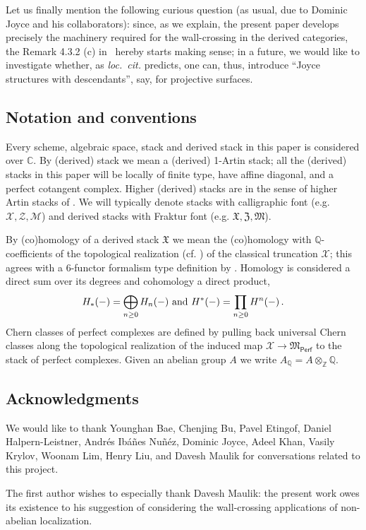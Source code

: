 \documentclass[12pt]{amsart}
\theoremstyle{definition}
\newcommand{\BC}{{\mathbb{C}}}
\newcommand{\BQ}{{\mathbb{Q}}}
\newcommand{\BZ}{{\mathbb{Z}}}
\newcommand{\CM}{{\mathcal M}}
\newcommand{\CX}{{\mathcal X}}
\newcommand{\CZ}{{\mathcal Z}}
\newcommand{\1}{\mathbf 1}
\newcommand{\FM}{{\mathfrak{M}}}
\newcommand{\FX}{{\mathfrak{X}}}
\newcommand{\FZ}{{\mathfrak{Z}}}
\newcommand{\Perf}{\mathsf{Perf}}
\begin{document}
Let us finally mention the following curious question (as usual,  due to Dominic Joyce and his collaborators): since, as we explain, the present paper develops precisely the machinery required for the wall-crossing in the derived categories, the Remark 4.3.2 (c) in~\cite{GJT} hereby starts making sense; in a future, we would like to investigate whether, as \textit{loc.~cit.} predicts, one can, thus, introduce ``Joyce structures with descendants'', say, for projective surfaces.

\subsection{Notation and conventions}\label{subsec: notation}
Every scheme, algebraic space, stack and derived stack in this paper is considered over $\BC$. By (derived) stack we mean a (derived) 1-Artin stack; all the (derived) stacks in this paper will be locally of finite type, have affine diagonal, and a perfect cotangent complex. Higher (derived) stacks are in the sense of higher Artin stacks of \cite{higherstackstoen}. We will typically denote stacks with calligraphic font (e.g. $\CX, \CZ, \CM$) and derived stacks with Fraktur font (e.g. $\FX, \FZ, \FM$).

By (co)homology of a derived stack $\FX$ we mean the (co)homology with $\BQ$-coefficients of the topological realization (cf. \cite[Section 3]{B16}) of the classical truncation $\CX$; this agrees with a 6-functor formalism type definition by \cite[Proposition 2.8]{khanequivcoh}. Homology is considered a direct sum over its degrees and cohomology a direct product, 
\[H_\ast(-)=\bigoplus_{n\geq 0}H_n(-)\textup{ and }H^\ast(-)=\prod_{n\geq 0}H^n(-)\,.\]
Chern classes of perfect complexes are defined by pulling back universal Chern classes along the topological realization of the induced map $\CX\to \FM_{\Perf}$ to the stack of perfect complexes. Given an abelian group $A$ we write $A_\BQ=A\otimes_\BZ \BQ$.


\subsection{Acknowledgments} We would like to thank Younghan Bae, Chenjing Bu, Pavel Etingof, Daniel Halpern-Leistner, Andrés Ibáñes Nuñéz, Dominic Joyce, Adeel Khan, Vasily Krylov,  Woonam Lim, Henry Liu, and Davesh Maulik for conversations related to this project.

The first author wishes to especially thank Davesh Maulik: the present work owes its existence to his suggestion of considering the wall-crossing applications of non-abelian localization.
\end{document}
